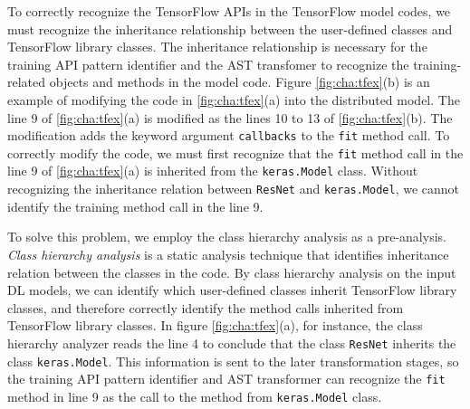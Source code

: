 To correctly recognize the TensorFlow APIs in the TensorFlow model codes, 
we must recognize the inheritance relationship between the user-defined classes 
and TensorFlow library classes.
The inheritance relationship is necessary for the training API pattern
identifier and the AST transfomer to recognize the training-related
objects and methods in the model code.
Figure \ref{fig:cha:tfex}(b) is an example of modifying the code in 
\ref{fig:cha:tfex}(a) into the distributed model.
The line 9 of \ref{fig:cha:tfex}(a) is modified as the lines 10 to 13 of 
\ref{fig:cha:tfex}(b). The modification adds the keyword argument 
{\tt callbacks} to the {\tt fit} method call. 
To correctly modify the code, we must first recognize that the {\tt fit} method
call in the line 9 of \ref{fig:cha:tfex}(a) is inherited from the
{\tt keras.Model} class.
Without recognizing the inheritance relation between {\tt ResNet} and
{\tt keras.Model}, we cannot identify the training method call 
in the line 9.  

To solve this problem, we employ the class hierarchy analysis as a pre-analysis.
\textit{Class hierarchy analysis} is a static analysis technique that identifies
inheritance relation between the classes in the code.
By class hierarchy analysis on the input DL models,
we can identify which user-defined classes inherit TensorFlow library classes,
and therefore correctly identify the method calls inherited from TensorFlow
library classes.
In figure \ref{fig:cha:tfex}(a), for instance, 
the class hierarchy analyzer reads the line 4 to conclude that the class
{\tt ResNet} inherits the class {\tt keras.Model}.
This information is sent to the later transformation stages,
so the training API pattern identifier and AST transformer can 
recognize the {\tt fit} method in line 9 as the call to the method from
{\tt keras.Model} class.
